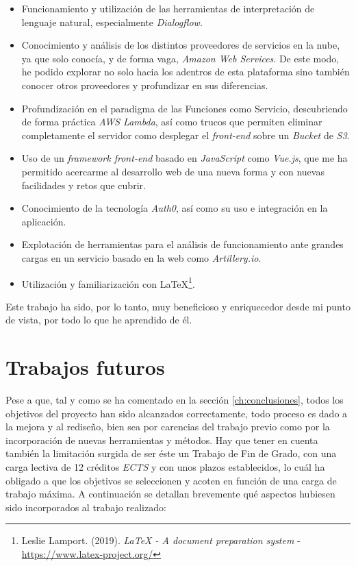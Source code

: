 \documentclass[11pt,spanish,listoffigures]{tfgetsinf}
\begin{document}
\begin{itemize}

\item Funcionamiento y utilización de las herramientas de interpretación de lenguaje natural, especialmente \textit{Dialogflow}. 

\item Conocimiento y análisis de los distintos proveedores de servicios en la nube, ya que solo conocía, y de forma vaga, \textit{Amazon Web Services}. De este modo, he podido explorar no solo hacia los adentros de esta plataforma sino también conocer otros proveedores y profundizar en sus diferencias.

\item Profundización en el paradigma de las Funciones como Servicio, descubriendo de forma práctica \textit{AWS Lambda}, así como trucos que permiten eliminar completamente el servidor como desplegar el \textit{front-end} sobre un \textit{Bucket} de \textit{S3}.

\item Uso de un \textit{framework front-end} basado en \textit{JavaScript} como \textit{Vue.js}, que me ha permitido acercarme al desarrollo web de una nueva forma y con nuevas facilidades y retos que cubrir.

\item Conocimiento de la tecnología \textit{Auth0}, así como su uso e integración en la aplicación.

\item Explotación de herramientas para el análisis de funcionamiento ante grandes cargas en un servicio basado en la web como \textit{Artillery.io}.

\item Utilización y familiarización con LaTeX\footnote{Leslie Lamport. (2019). \textit{LaTeX - A document preparation system} - \url{https://www.latex-project.org/}}.

\end{itemize}

Este trabajo ha sido, por lo tanto, muy beneficioso y enriquecedor desde mi punto de vista, por todo lo que he aprendido de él.

\section{Trabajos futuros}

Pese a que, tal y como se ha comentado en la sección \ref{ch:conclusiones}, todos los objetivos del proyecto han sido alcanzados correctamente, todo proceso es dado a la mejora y al rediseño, bien sea por carencias del trabajo previo como por la incorporación de nuevas herramientas y métodos. Hay que tener en cuenta también la limitación surgida de ser éste un Trabajo de Fin de Grado, con una carga lectiva de 12 créditos \textit{ECTS} y con unos plazos establecidos, lo cuál ha obligado a que los objetivos se seleccionen y acoten en función de una carga de trabajo máxima. A continuación se detallan brevemente qué aspectos hubiesen sido incorporados al trabajo realizado: 
\end{document}
